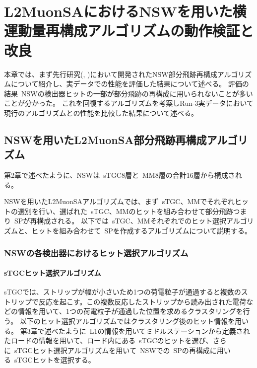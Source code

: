\chapter{L2MuonSAにおけるNSWを用いた横運動量再構成アルゴリズムの動作検証と改良}\label{chapter5}


本章では、まず先行研究(\cite{article:kumaoka}, \cite{article:noguchi})において開発されたNSW部分飛跡再構成アルゴリズムについて紹介し、実データでの性能を評価した結果について述べる。
評価の結果~NSWの検出器ヒットの一部が部分飛跡の再構成に用いられないことが多いことが分かった。
これを回復するアルゴリズムを考案しRun-3実データにおいて現行のアルゴリズムとの性能を比較した結果について述べる。


\section{NSWを用いたL2MuonSA部分飛跡再構成アルゴリズム}\label{chapter5-1}
第2章で述べたように、NSWは~sTGC8層と~MM8層の合計16層から構成される。

NSWを用いたL2MuonSAアルゴリズムでは、まず~sTGC、MMでそれぞれヒットの選別を行い、選ばれた~sTGC、MMのヒットを組み合わせて部分飛跡つまり~SPが再構成される。
以下では~sTGC、MMそれぞれでのヒット選択アルゴリズムと、ヒットを組み合わせて~SPを作成するアルゴリズムについて説明する。

\subsection{NSWの各検出器におけるヒット選択アルゴリズム}\label{chapter5-1-1}
\subsubsection{sTGCヒット選択アルゴリズム}
sTGCでは、ストリップが幅が小さいため1つの荷電粒子が通過すると複数のストリップで反応を起こす。この複数反応したストリップから読み出された電荷などの情報を用いて、1つの荷電粒子が通過した位置を求めるクラスタリングを行う。
以下のヒット選択アルゴリズムではクラスタリング後のヒット情報を用いる。
第3章で述べたように~L1の情報を用いてミドルステーションから定義されたロードの情報を用いて、ロード内にある~sTGCのヒットを選び、さらに~sTGCヒット選択アルゴリズムを用いて~NSWでの~SPの再構成に用いる~sTGCヒットを選択する。


